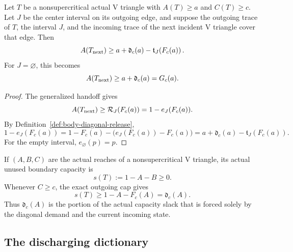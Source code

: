 \begin{proposition}
\label{prop:body-exact-discharging}
Let \(T\) be a nonsupercritical actual V triangle with
\(A(T)\ge a\) and \(C(T)\ge c\).  Let \(J\) be the center interval on its
outgoing edge, and suppose the outgoing trace of \(T\), the interval \(J\),
and the incoming trace of the next incident V triangle cover that edge.  Then
\begin{equation}
 A(T_{\rm next})
 \ge
 a+\mathfrak d_c(a)
   -\mathfrak t_J\!\left(F_c(a)\right).
 \label{eq:body-exact-discharging}
\end{equation}
For \(J=\varnothing\), this becomes
\begin{equation}
 A(T_{\rm next})\ge a+\mathfrak d_c(a)=G_c(a).
 \label{eq:body-center-free-discharge}
\end{equation}
\end{proposition}

\begin{proof}
The generalized handoff gives
\[
 A(T_{\rm next})
 \ge \mathcal R_J(F_c(a))
 =1-e_J(F_c(a)).
\]
By Definition~\ref{def:body-diagonal-release},
\[
 1-e_J(F_c(a))
 =1-F_c(a)-\bigl(e_J(F_c(a))-F_c(a)\bigr)
 =a+\mathfrak d_c(a)-\mathfrak t_J(F_c(a)).
\]
For the empty interval, \(e_\varnothing(p)=p\).
\end{proof}

If \((A,B,C)\) are the actual reaches of a nonsupercritical V triangle, its
actual unused boundary capacity is
\[
 s(T):=1-A-B\ge0.
\]
Whenever \(C\ge c\), the exact outgoing cap gives
\begin{equation}
 s(T)\ge1-A-F_c(A)=\mathfrak d_c(A).
 \label{eq:body-slack-dominates-release}
\end{equation}
Thus \(\mathfrak d_c(A)\) is the portion of the actual capacity slack that is
forced solely by the diagonal demand and the current incoming state.

\subsection{The discharging dictionary}

